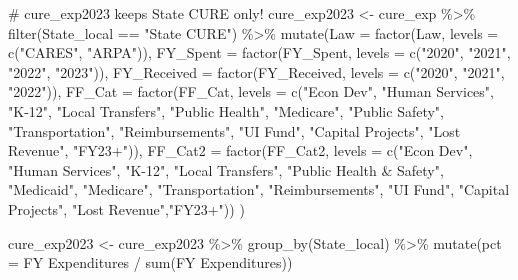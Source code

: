 \documentclass[
  letterpaper,
  DIV=11,
  numbers=noendperiod]{scrreport}
\newenvironment{Shaded}{\begin{snugshade}}{\end{snugshade}}
\newcommand{\AttributeTok}[1]{\textcolor[rgb]{0.40,0.45,0.13}{#1}}
\newcommand{\CommentTok}[1]{\textcolor[rgb]{0.37,0.37,0.37}{#1}}
\newcommand{\FunctionTok}[1]{\textcolor[rgb]{0.28,0.35,0.67}{#1}}
\newcommand{\NormalTok}[1]{\textcolor[rgb]{0.00,0.23,0.31}{#1}}
\newcommand{\OtherTok}[1]{\textcolor[rgb]{0.00,0.23,0.31}{#1}}
\newcommand{\SpecialCharTok}[1]{\textcolor[rgb]{0.37,0.37,0.37}{#1}}
\newcommand{\StringTok}[1]{\textcolor[rgb]{0.13,0.47,0.30}{#1}}
\begin{document}
\begin{Shaded}
\begin{Highlighting}[]
\CommentTok{\# cure\_exp2023 keeps State CURE only!}
\NormalTok{cure\_exp2023 }\OtherTok{\textless{}{-}}\NormalTok{ cure\_exp }\SpecialCharTok{\%\textgreater{}\%}
  \FunctionTok{filter}\NormalTok{(State\_local }\SpecialCharTok{==} \StringTok{"State CURE"}\NormalTok{) }\SpecialCharTok{\%\textgreater{}\%}
  \FunctionTok{mutate}\NormalTok{(}\AttributeTok{Law =} \FunctionTok{factor}\NormalTok{(Law, }\AttributeTok{levels =} \FunctionTok{c}\NormalTok{(}\StringTok{"CARES"}\NormalTok{, }\StringTok{"ARPA"}\NormalTok{)),}
         \AttributeTok{FY\_Spent =} \FunctionTok{factor}\NormalTok{(FY\_Spent, }\AttributeTok{levels =} \FunctionTok{c}\NormalTok{(}\StringTok{"2020"}\NormalTok{, }\StringTok{"2021"}\NormalTok{, }\StringTok{"2022"}\NormalTok{, }\StringTok{"2023"}\NormalTok{)),}
         \AttributeTok{FY\_Received =} \FunctionTok{factor}\NormalTok{(FY\_Received, }\AttributeTok{levels =} \FunctionTok{c}\NormalTok{(}\StringTok{"2020"}\NormalTok{, }\StringTok{"2021"}\NormalTok{, }\StringTok{"2022"}\NormalTok{)),}
        \AttributeTok{FF\_Cat =} \FunctionTok{factor}\NormalTok{(FF\_Cat, }\AttributeTok{levels =} \FunctionTok{c}\NormalTok{(}\StringTok{"Econ Dev"}\NormalTok{, }\StringTok{"Human Services"}\NormalTok{, }\StringTok{"K{-}12"}\NormalTok{, }\StringTok{"Local Transfers"}\NormalTok{, }\StringTok{"Public Health"}\NormalTok{, }\StringTok{"Medicare"}\NormalTok{, }\StringTok{"Public Safety"}\NormalTok{, }\StringTok{"Transportation"}\NormalTok{, }\StringTok{"Reimbursements"}\NormalTok{,  }\StringTok{"UI Fund"}\NormalTok{, }\StringTok{"Capital Projects"}\NormalTok{, }\StringTok{"Lost Revenue"}\NormalTok{, }\StringTok{"FY23+"}\NormalTok{)),}
        \AttributeTok{FF\_Cat2 =} \FunctionTok{factor}\NormalTok{(FF\_Cat2, }\AttributeTok{levels =} \FunctionTok{c}\NormalTok{(}\StringTok{"Econ Dev"}\NormalTok{, }\StringTok{"Human Services"}\NormalTok{, }\StringTok{"K{-}12"}\NormalTok{, }\StringTok{"Local Transfers"}\NormalTok{, }\StringTok{"Public Health \& Safety"}\NormalTok{, }\StringTok{"Medicaid"}\NormalTok{, }\StringTok{"Medicare"}\NormalTok{, }\StringTok{"Transportation"}\NormalTok{, }\StringTok{"Reimbursements"}\NormalTok{, }\StringTok{"UI Fund"}\NormalTok{, }\StringTok{"Capital Projects"}\NormalTok{, }\StringTok{"Lost Revenue"}\NormalTok{,}\StringTok{"FY23+"}\NormalTok{))}
\NormalTok{      )}


\NormalTok{cure\_exp2023 }\OtherTok{\textless{}{-}}\NormalTok{ cure\_exp2023 }\SpecialCharTok{\%\textgreater{}\%} 
  \FunctionTok{group\_by}\NormalTok{(State\_local) }\SpecialCharTok{\%\textgreater{}\%} 
  \FunctionTok{mutate}\NormalTok{(}\AttributeTok{pct =} \StringTok{\textasciigrave{}}\AttributeTok{FY Expenditures}\StringTok{\textasciigrave{}} \SpecialCharTok{/} \FunctionTok{sum}\NormalTok{(}\StringTok{\textasciigrave{}}\AttributeTok{FY Expenditures}\StringTok{\textasciigrave{}}\NormalTok{))}


\end{Highlighting}
\end{Shaded}
\end{document}
